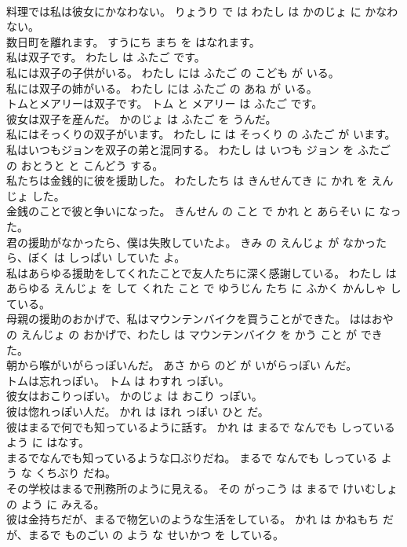 \documentclass[8pt]{extreport}
\begin{document}
\begin{CJK}{UTF8}{min}
\\	料理では私は彼女にかなわない。	りょうり で は わたし は かのじょ に かなわない。	
\\	数日町を離れます。	すうにち まち を はなれます。	
\\	私は双子です。	わたし は ふたご です。	
\\	私には双子の子供がいる。	わたし には ふたご の こども が いる。	
\\	私には双子の姉がいる。	わたし には ふたご の あね が いる。	
\\	トムとメアリーは双子です。	トム と メアリー は ふたご です。	
\\	彼女は双子を産んだ。	かのじょ は ふたご を うんだ。	
\\	私にはそっくりの双子がいます。	わたし に は そっくり の ふたご が います。	
\\	私はいつもジョンを双子の弟と混同する。	わたし は いつも ジョン を ふたご の おとうと と こんどう する。	
\\	私たちは金銭的に彼を援助した。	わたしたち は きんせんてき に かれ を えんじょ した。	
\\	金銭のことで彼と争いになった。	きんせん の こと で かれ と あらそい に なった。	
\\	君の援助がなかったら、僕は失敗していたよ。	きみ の えんじょ が なかったら、ぼく は しっぱい していた よ。	
\\	私はあらゆる援助をしてくれたことで友人たちに深く感謝している。	わたし は あらゆる えんじょ を して くれた こと で ゆうじん たち に ふかく かんしゃ している。	
\\	母親の援助のおかげで、私はマウンテンバイクを買うことができた。	ははおや の えんじょ の おかげで、わたし は マウンテンバイク を かう こと が できた。	
\\	朝から喉がいがらっぽいんだ。	あさ から のど が いがらっぽい んだ。	
\\	トムは忘れっぽい。	トム は わすれ っぽい。	
\\	彼女はおこりっぽい。	かのじょ は おこり っぽい。	
\\	彼は惚れっぽい人だ。	かれ は ほれ っぽい ひと だ。	
\\	彼はまるで何でも知っているように話す。	かれ は まるで なんでも しっている よう に はなす。	
\\	まるでなんでも知っているような口ぶりだね。	まるで なんでも しっている よう な くちぶり だね。	
\\	その学校はまるで刑務所のように見える。	その がっこう は まるで けいむしょ の よう に みえる。	
\\	彼は金持ちだが、まるで物乞いのような生活をしている。	かれ は かねもち だ が、まるで ものごい の よう な せいかつ を している。	

\end{CJK}
\end{document}
